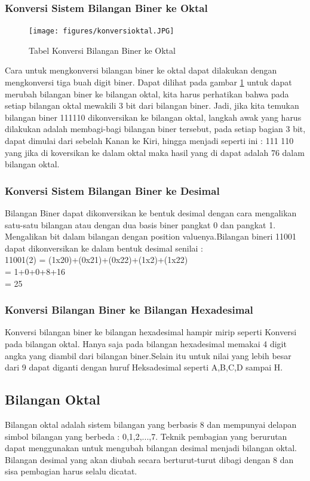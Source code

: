 \subsubsection{Konversi Sistem Bilangan Biner ke Oktal}
\begin{figure}[ht]
\centerline{\texttt{[image: figures/konversioktal.JPG]}}
\caption{Tabel Konversi Bilangan Biner ke Oktal}
\label{konversioktal}
\end{figure}
\break
Cara untuk mengkonversi bilangan biner ke oktal dapat dilakukan dengan mengkonversi tiga buah digit biner. Dapat dilihat pada gambar \ref{konversioktal} untuk dapat merubah bilangan biner ke bilangan oktal, kita harus perhatikan bahwa pada setiap bilangan oktal mewakili 3 bit dari bilangan biner. Jadi, jika kita temukan bilangan biner 111110 dikonversikan ke bilangan oktal, langkah awak yang harus dilakukan adalah membagi-bagi bilangan biner tersebut, pada setiap bagian 3 bit, dapat dimulai dari sebelah Kanan ke Kiri, hingga menjadi seperti ini : 111 110 yang jika di koversikan ke dalam oktal maka hasil yang di dapat adalah 76 dalam bilangan oktal.

\subsubsection{Konversi Sistem Bilangan Biner ke Desimal}
Bilangan Biner dapat dikonversikan ke bentuk desimal dengan cara mengalikan satu-satu bilangan atau dengan dua basis biner pangkat 0 dan pangkat 1. Mengalikan bit dalam bilangan dengan position valuenya.Bilangan bineri 11001 dapat dikonversikan ke dalam bentuk desimal senilai : \\

11001(2) = (1x20)+(0x21)+(0x22)+(1x2)+(1x22) \\
= 1+0+0+8+16 \\
= 25

\subsubsection{Konversi Bilangan Biner ke Bilangan Hexadesimal}
Konversi bilangan biner ke bilangan hexadesimal hampir mirip seperti Konversi pada bilangan oktal. Hanya saja pada bilangan hexadesimal memakai 4 digit angka yang diambil dari bilangan biner.Selain itu untuk nilai yang lebih besar dari 9 dapat diganti dengan huruf Heksadesimal seperti A,B,C,D sampai H. 
\subsection{Bilangan Oktal}
Bilangan oktal adalah sistem bilangan yang berbasis 8 dan mempunyai delapan simbol bilangan yang berbeda : 0,1,2,...,7.
Teknik pembagian yang berurutan dapat menggunakan untuk mengubah bilangan desimal menjadi bilangan oktal. Bilangan desimal yang akan diubah secara berturut-turut dibagi dengan 8 dan sisa pembagian harus selalu dicatat. 
